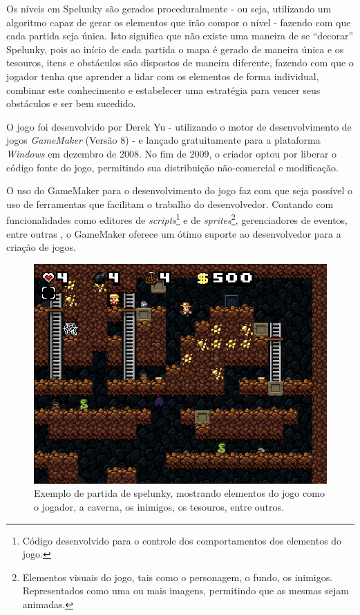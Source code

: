 Os níveis em Spelunky são gerados proceduralmente - ou seja, utilizando um
algoritmo capaz de gerar os elementos que irão compor o nível - fazendo com que
cada partida seja única. Isto significa que não existe uma maneira de se
``decorar'' Spelunky, pois ao início de cada partida o mapa é gerado de maneira
única e os tesouros, itens e obstáculos são dispostos de maneira diferente,
fazendo com que o jogador tenha que aprender a lidar com os elementos de forma
individual, combinar este conhecimento e estabelecer uma estratégia para vencer
seus obstáculos e ser bem sucedido.

O jogo foi desenvolvido por Derek Yu - utilizando o motor de desenvolvimento de
jogos \textit{GameMaker} (Versão 8) - e lançado gratuitamente para a plataforma
\textit{Windows} em dezembro de 2008\cite{SPELUNKYRELEASE}. No fim de 2009, o
criador optou por liberar o código fonte do jogo, permitindo sua distribuição
não-comercial e modificação\cite{SPELUNKYLICENSE}.

O uso do GameMaker para o desenvolvimento do jogo faz com que seja possível o
uso de ferramentas que facilitam o trabalho do desenvolvedor. Contando com
funcionalidades como editores de \textit{scripts}\footnote{Código desenvolvido
para o controle dos comportamentos dos elementos do jogo.} e de
\textit{sprites}\footnote{Elementos visuais do jogo, tais como o personagem, o
fundo, os inimigos. Representados como uma ou mais imagens, permitindo que as
mesmas sejam animadas.}, gerenciadores de eventos, entre outras
\cite{GMAKER8DOCS}, o GameMaker oferece um ótimo suporte ao desenvolvedor para
a criação de jogos.

\begin{figure}[htb!]
\centering\includegraphics[width=.65\textwidth]{fig/spelunky-pc-screen.png}
\caption
    {\label{fig:spelunky-gameplay}Exemplo de partida de spelunky, mostrando
    elementos do jogo como o jogador, a caverna, os inimigos, os tesouros,
    entre outros.}
\end{figure}

